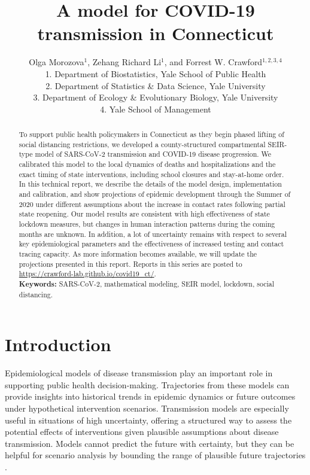\documentclass[11pt]{article}
\title{A model for COVID-19 transmission in Connecticut}
\author{Olga Morozova$^{1}$,
  Zehang Richard Li$^1$,
and Forrest W. Crawford$^{1,2,3,4}$  \\[1em]
\small 1. Department of Biostatistics, Yale School of Public Health \\
\small 2. Department of Statistics \& Data Science, Yale University \\
\small 3. Department of Ecology \& Evolutionary Biology, Yale University \\
\small 4. Yale School of Management }
\begin{document}
\maketitle


\begin{abstract}
\noindent
To support public health policymakers in Connecticut as they begin phased lifting of social distancing restrictions, we developed a county-structured compartmental SEIR-type model of SARS-CoV-2 transmission and COVID-19 disease progression. We calibrated this model to the local dynamics of deaths and hospitalizations and the exact timing of state interventions, including school closures and stay-at-home order.  In this technical report, we describe the details of the model design, implementation and calibration, and show projections of epidemic development through the Summer of 2020 under different assumptions about the increase in contact rates following partial state reopening.  Our model results are consistent with high effectiveness of state lockdown measures, but changes in human interaction patterns during the coming months are unknown.
In addition, a lot of uncertainty remains with respect to several key epidemiological parameters and the effectiveness of increased testing and contact tracing capacity. 
As more information becomes available, we will update the projections presented in this report. Reports in this series are posted to \url{https://crawford-lab.github.io/covid19_ct/}. \\[1em]
\textbf{Keywords:} SARS-CoV-2, mathematical modeling, SEIR model, lockdown, social distancing.
\end{abstract}



\section{Introduction}


Epidemiological models of disease transmission play an important role in supporting public health decision-making. Trajectories from these models can provide insights into historical trends in epidemic dynamics or future outcomes under hypothetical intervention scenarios. 
Transmission models are especially useful in situations of high uncertainty, offering a structured way to assess the potential effects of interventions given plausible assumptions about disease transmission.  Models cannot predict the future with certainty, but they can be helpful for scenario analysis by bounding the range of plausible future trajectories \citep{holmdahl2020wrong}. 
\end{document}
